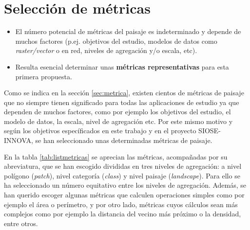 \section{Selección de métricas}

\begin{graybox}
\begin{itemize}
\item El número potencial de métricas del paisaje es indeterminado y depende de muchos factores (p.ej. objetivos del estudio, modelos de datos como \textit{raster/vector} o en red, niveles de agregación y/o escala, etc).
\item Resulta esencial determinar unas \textbf{métricas representativas} para esta primera propuesta.
\end{itemize}
\end{graybox}

Como se indica en la sección \ref{sec:metrica}, existen cientos de métricas de paisaje que no siempre tienen significado para todas las aplicaciones de estudio ya que dependen de muchos factores, como por ejemplo los objetivos del estudio, el modelo de datos, la escala, nivel de agregación etc. Por este mismo motivo y según los objetivos específicados en este trabajo y en el proyecto SIOSE-INNOVA, se han seleccionado unas determinadas métricas de paisaje.

En la tabla \ref{tab:listmetricas} se aprecian las métricas, acompañadas por su abreviatura, que se han escogido divididas en tres niveles de agregación: a nivel polígono (\textit{patch}), nivel categoría (\textit{class}) y nivel paisaje (\textit{landscape}). Para ello se ha seleccionado un número equitativo entre los niveles de agregación. Además, se han querido escoger algunas métricas que calculen operaciones simples como por ejemplo el área o perímetro, y por otro lado, métricas cuyos cálculos sean más complejos como por ejemplo la distancia del vecino más próximo o la densidad, entre otros.

